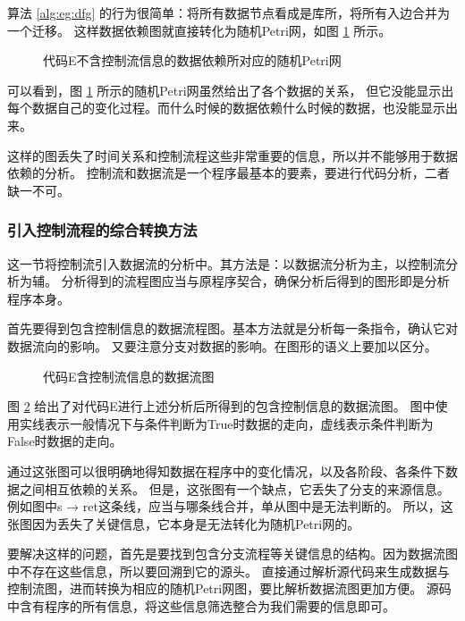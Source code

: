 算法 \ref{alg:eg:dfg} 的行为很简单：将所有数据节点看成是库所，将所有入边合并为一个迁移。
这样数据依赖图就直接转化为随机Petri网，如图 \ref{fig:eg:dfgraw} 所示。

\newsavebox{\egdfgraw}
\begin{figure}[!hbt]
\centering
\usebox{\egdfgraw}
\caption{代码E不含控制流信息的数据依赖所对应的随机Petri网} \label{fig:eg:dfgraw}
\end{figure}

可以看到，图 \ref{fig:eg:dfgraw} 所示的随机Petri网虽然给出了各个数据的关系，
但它没能显示出每个数据自己的变化过程。而什么时候的数据依赖什么时候的数据，也没能显示出来。

这样的图丢失了时间关系和控制流程这些非常重要的信息，所以并不能够用于数据依赖的分析。
控制流和数据流是一个程序最基本的要素，要进行代码分析，二者缺一不可。

\subsubsection{引入控制流程的综合转换方法} \label{sec:dcfgconv}

这一节将控制流引入数据流的分析中。其方法是：以数据流分析为主，以控制流分析为辅。
分析得到的流程图应当与原程序契合，确保分析后得到的图形即是分析程序本身。

首先要得到包含控制信息的数据流程图。基本方法就是分析每一条指令，确认它对数据流向的影响。
又要注意分支对数据的影响。在图形的语义上要加以区分。

\newsavebox{\egdfgctrl}
\begin{figure}[!hbt]
\centering
\usebox{\egdfgctrl}
\caption{代码E含控制流信息的数据流图} \label{fig:eg:dfgctrl}
\end{figure}

图 \ref{fig:eg:dfgctrl} 给出了对代码E进行上述分析后所得到的包含控制信息的数据流图。
图中使用实线表示一般情况下与条件判断为True时数据的走向，虚线表示条件判断为False时数据的走向。

通过这张图可以很明确地得知数据在程序中的变化情况，以及各阶段、各条件下数据之间相互依赖的关系。
但是，这张图有一个缺点，它丢失了分支的来源信息。例如图中s → ret这条线，应当与哪条线合并，单从图中是无法判断的。
所以，这张图因为丢失了关键信息，它本身是无法转化为随机Petri网的。

要解决这样的问题，首先是要找到包含分支流程等关键信息的结构。因为数据流图中不存在这些信息，所以要回溯到它的源头。
直接通过解析源代码来生成数据与控制流图，进而转换为相应的随机Petri网图，要比解析数据流图更加方便。
源码中含有程序的所有信息，将这些信息筛选整合为我们需要的信息即可。

